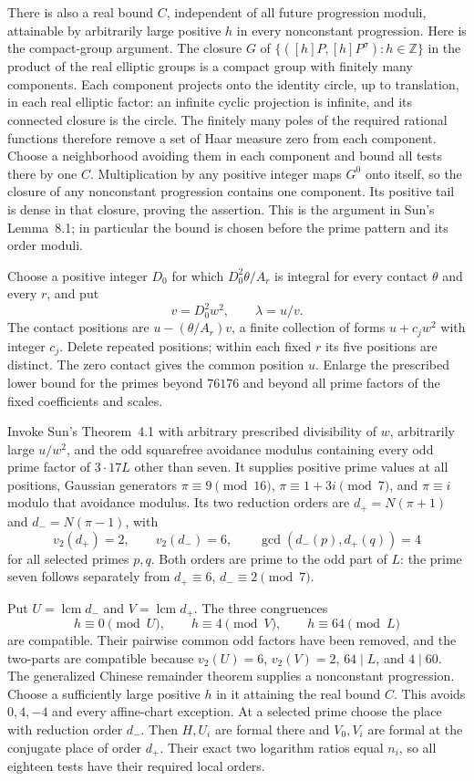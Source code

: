 \documentclass[11pt]{article}
\theoremstyle{definition}
\begin{document}
There is also a real bound $C$, independent of all future progression
moduli, attainable by arbitrarily large positive $h$ in every
nonconstant progression. Here is the compact-group argument. The
closure $G$ of $\{([h]P,[h]P^\sigma):h\in\mathbb Z\}$ in the
product of the real elliptic groups is a compact group with finitely
many components. Each component projects onto the identity circle,
up to translation, in each real elliptic factor: an infinite cyclic
projection is infinite, and its connected closure is the circle.
The finitely many poles of the required rational functions therefore
remove a set of Haar measure zero from each component. Choose a
neighborhood avoiding them in each component and bound all tests
there by one $C$. Multiplication by any positive integer maps $G^0$
onto itself, so the closure of any nonconstant progression contains
one component. Its positive tail is dense in that closure, proving
the assertion. This is the argument in Sun's Lemma~8.1; in particular
the bound is chosen before the prime pattern and its order moduli.

Choose a positive integer $D_0$ for which $D_0^2\theta/A_r$ is integral
for every contact $\theta$ and every $r$, and put
\[
 v=D_0^2w^2,\qquad \lambda=u/v.
\]
The contact positions are $u-(\theta/A_r)v$, a finite collection of
forms $u+c_jw^2$ with integer $c_j$. Delete repeated positions;
within each fixed $r$ its five positions are distinct. The zero
contact gives the common position $u$. Enlarge the prescribed lower
bound for the primes beyond $76176$ and beyond all prime factors of
the fixed coefficients and scales.

Invoke Sun's Theorem~4.1 with arbitrary prescribed divisibility of $w$,
arbitrarily large $u/w^2$, and the odd squarefree avoidance modulus
containing every odd prime factor of $3\cdot17L$ other than seven.
It supplies positive prime values at all positions, Gaussian
generators $\pi\equiv9\pmod{16}$, $\pi\equiv1+3i\pmod7$, and
$\pi\equiv i$ modulo that avoidance modulus. Its two reduction orders
are $d_+=N(\pi+1)$ and $d_-=N(\pi-1)$, with
\[
 v_2(d_+)=2,\qquad v_2(d_-)=6,\qquad
 \gcd(d_-(p),d_+(q))=4
\]
for all selected primes $p,q$. Both orders are prime to the odd part
of $L$: the prime seven follows separately from
$d_+\equiv6$, $d_-\equiv2\pmod7$.

Put $U=\operatorname{lcm}d_-$ and $V=\operatorname{lcm}d_+$.
The three congruences
\[
 h\equiv0\pmod U,\qquad h\equiv4\pmod V,\qquad
 h\equiv64\pmod L
\]
are compatible. Their pairwise common odd factors have been removed,
and the two-parts are compatible because
$v_2(U)=6$, $v_2(V)=2$, $64\mid L$, and $4\mid60$.
The generalized Chinese remainder theorem supplies a nonconstant
progression. Choose a sufficiently large positive $h$ in it attaining
the real bound $C$. This avoids $0,4,-4$ and every affine-chart
exception. At a selected prime choose the place with reduction order
$d_-$. Then $H,U_i$ are formal there and $V_0,V_i$ are formal at the
conjugate place of order $d_+$. Their exact two logarithm ratios equal
$n_i$, so all eighteen tests have their required local orders.
\end{document}
